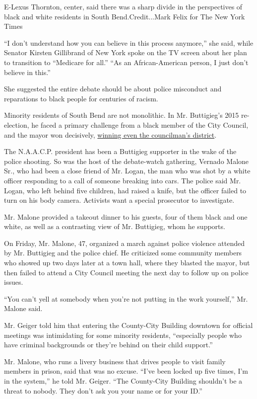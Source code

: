E-Lexus Thornton, center, said there was a sharp divide in the
perspectives of black and white residents in South Bend.Credit...Mark
Felix for The New York Times

``I don't understand how you can believe in this process anymore,'' she
said, while Senator Kirsten Gillibrand of New York spoke on the TV
screen about her plan to transition to ``Medicare for all.'' ``As an
African-American person, I just don't believe in this.''

She suggested the entire debate should be about police misconduct and
reparations to black people for centuries of racism.

Minority residents of South Bend are not monolithic. In Mr. Buttigieg's
2015 re-election, he faced a primary challenge from a black member of
the City Council, and the mayor won decisively,
\href{https://southbendvoice.com/2015/05/07/what-does-electoral-victory-look-like-visualizing-mayor-pete-buttigiegs-win/}{winning
even the councilman's district}.

The N.A.A.C.P. president has been a Buttigieg supporter in the wake of
the police shooting. So was the host of the debate-watch gathering,
Vernado Malone Sr., who had been a close friend of Mr. Logan, the man
who was shot by a white officer responding to a call of someone breaking
into cars. The police said Mr. Logan, who left behind five children, had
raised a knife, but the officer failed to turn on his body camera.
Activists want a special prosecutor to investigate.

Mr. Malone provided a takeout dinner to his guests, four of them black
and one white, as well as a contrasting view of Mr. Buttigieg, whom he
supports.

On Friday, Mr. Malone, 47, organized a march against police violence
attended by Mr. Buttigieg and the police chief. He criticized some
community members who showed up two days later at a town hall, where
they blasted the mayor, but then failed to attend a City Council meeting
the next day to follow up on police issues.

``You can't yell at somebody when you're not putting in the work
yourself,'' Mr. Malone said.

Mr. Geiger told him that entering the County-City Building downtown for
official meetings was intimidating for some minority residents,
``especially people who have criminal backgrounds or they're behind on
their child support.''

Mr. Malone, who runs a livery business that drives people to visit
family members in prison, said that was no excuse. ``I've been locked up
five times, I'm in the system,'' he told Mr. Geiger. ``The County-City
Building shouldn't be a threat to nobody. They don't ask you your name
or for your ID.''


